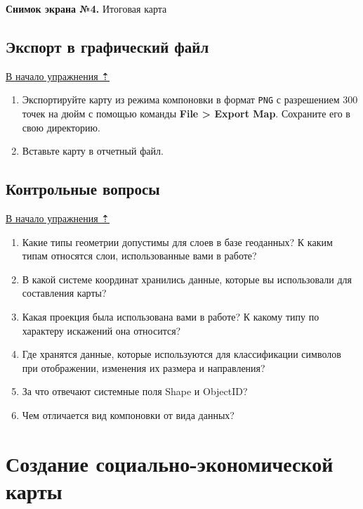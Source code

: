 \documentclass[12pt,]{book}
\begin{document}
\textbf{Снимок экрана №4.} Итоговая карта

\hypertarget{map-design-climates-export}{%
\section{Экспорт в графический файл}\label{map-design-climates-export}}

\protect\hyperlink{map-design-climates}{В начало упражнения ⇡}

\begin{enumerate}
\def\labelenumi{\arabic{enumi}.}
\item
  Экспортируйте карту из режима компоновки в формат \texttt{PNG} с разрешением 300 точек на дюйм с помощью команды \textbf{File \textgreater{} Export Map}. Сохраните его в свою директорию.
\item
  Вставьте карту в отчетный файл.
\end{enumerate}

\hypertarget{map-design-climates-questions}{%
\section{Контрольные вопросы}\label{map-design-climates-questions}}

\protect\hyperlink{map-design-climates}{В начало упражнения ⇡}

\begin{enumerate}
\def\labelenumi{\arabic{enumi}.}
\item
  Какие типы геометрии допустимы для слоев в базе геоданных? К каким типам относятся слои, использованные вами в работе?
\item
  В какой системе координат хранились данные, которые вы использовали для составления карты?
\item
  Какая проекция была использована вами в работе? К какому типу по характеру искажений она относится?
\item
  Где хранятся данные, которые используются для классификации символов при отображении, изменения их размера и направления?
\item
  За что отвечают системные поля Shape и ObjectID?
\item
  Чем отличается вид компоновки от вида данных?
\end{enumerate}

\hypertarget{map-design-economic}{%
\chapter{Создание социально-экономической карты}\label{map-design-economic}}
\end{document}
